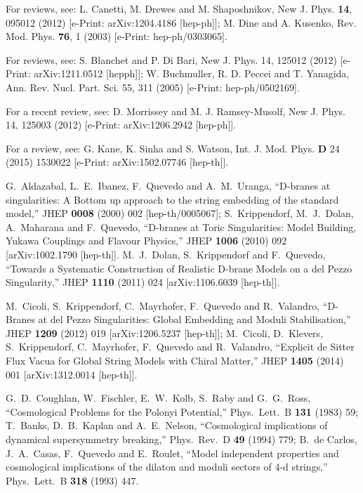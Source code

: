 \documentclass[11pt,a4paper]{article}
\begin{document}
\begin{thebibliography}{99}

For reviews, see: L. Canetti, M. Drewes and M. Shaposhnikov, New J. Phys. {\bf 14}, 095012 (2012) [e-Print: arXiv:1204.4186 [hep-ph]]; M. Dine and A. Kusenko, Rev. Mod. Phys. {\bf 76}, 1 (2003) [e-Print: hep-ph/0303065].

For reviews, see: S. Blanchet and P. Di Bari, New J.
Phys. 14, 125012 (2012) [e-Print: arXiv:1211.0512 [hepph]];
W. Buchmuller, R. D. Peccei and T. Yanagida,
Ann. Rev. Nucl. Part. Sci. 55, 311 (2005) [e-Print: hep-ph/0502169].

For a recent review, see: D. Morrissey and M. J.
Ramsey-Musolf, New J. Phys. 14, 125003 (2012) [e-Print: arXiv:1206.2942 [hep-ph]].

For a review, see: G. Kane, K. Sinha and S. Watson, Int. J. Mod. Phys. {\bf D} 24 (2015) 1530022 [e-Print: arXiv:1502.07746 [hep-th]].

  G.~Aldazabal, L.~E.~Ibanez, F.~Quevedo and A.~M.~Uranga,
  ``D-branes at singularities: A Bottom up approach to the string embedding of the standard model,''
  JHEP {\bf 0008} (2000) 002
  [hep-th/0005067];
  S.~Krippendorf, M.~J.~Dolan, A.~Maharana and F.~Quevedo,
 ``D-branes at Toric Singularities: Model Building, Yukawa Couplings and Flavour Physics,''
  JHEP {\bf 1006} (2010) 092
  [arXiv:1002.1790 [hep-th]].
  M.~J.~Dolan, S.~Krippendorf and F.~Quevedo,
  ``Towards a Systematic Construction of Realistic D-brane Models on a del Pezzo Singularity,''
  JHEP {\bf 1110} (2011) 024
  [arXiv:1106.6039 [hep-th]].

M.~Cicoli, S.~Krippendorf, C.~Mayrhofer, F.~Quevedo and R.~Valandro,
  ``D-Branes at del Pezzo Singularities: Global Embedding and Moduli Stabilisation,''
  JHEP {\bf 1209} (2012) 019
  [arXiv:1206.5237 [hep-th]];
M.~Cicoli, D.~Klevers, S.~Krippendorf, C.~Mayrhofer, F.~Quevedo and R.~Valandro,
  ``Explicit de Sitter Flux Vacua for Global String Models with Chiral Matter,''
  JHEP {\bf 1405} (2014) 001
  [arXiv:1312.0014 [hep-th]].

G.~D.~Coughlan, W.~Fischler, E.~W.~Kolb, S.~Raby and G.~G.~Ross,
  ``Cosmological Problems for the Polonyi Potential,''
  Phys.\ Lett.\ B {\bf 131} (1983) 59;
T.~Banks, D.~B.~Kaplan and A.~E.~Nelson,
  ``Cosmological implications of dynamical supersymmetry breaking,''
  Phys.\ Rev.\ D {\bf 49} (1994) 779;
B.~de Carlos, J.~A.~Casas, F.~Quevedo and E.~Roulet,
  ``Model independent properties and cosmological implications of the dilaton and moduli sectors of 4-d strings,''
  Phys.\ Lett.\ B {\bf 318} (1993) 447.


\end{thebibliography}
\end{document}
